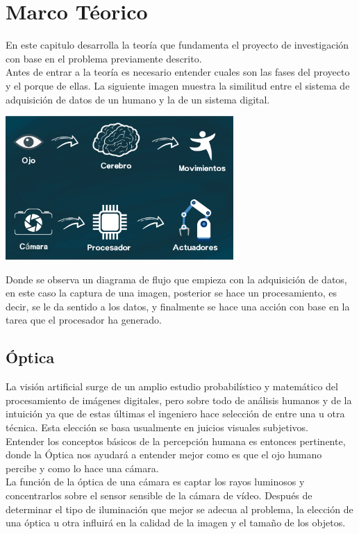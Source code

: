 \chapter{Marco Téorico}
En este capitulo desarrolla la teoría que fundamenta el proyecto de investigación con base
en el problema previamente descrito.\\
Antes de entrar a la teoría es necesario entender cuales son las fases del proyecto y
el porque de ellas.
La siguiente imagen muestra la similitud entre el sistema de adquisición de datos
de un humano y la de un sistema digital.
\begin{center}
    \includegraphics[width=0.65\textwidth]{Capitulo2/Fig1.eps}       
    \label{Fig1}
\end{center}
Donde se observa un diagrama de flujo que empieza con la adquisición de datos, en este
caso la captura de una imagen, posterior se hace un procesamiento, es decir, se le da
sentido a los datos, y finalmente se hace una acción con base en la tarea que el procesador
ha generado.

\section{Óptica}
La visión artificial surge de un amplio estudio probabilístico y matemático del 
procesamiento de imágenes digitales, pero sobre todo de análisis humanos y de la 
intuición ya que de estas últimas el ingeniero hace selección de entre una u otra 
técnica. Esta elección se basa usualmente en juicios visuales subjetivos.\\
Entender los conceptos básicos de la percepción humana es entonces pertinente, donde 
la Óptica nos ayudará a entender mejor como es que el ojo humano percibe y como lo 
hace una cámara. \\
La función de la óptica de una cámara es captar los rayos luminosos y concentrarlos 
sobre el sensor sensible de la cámara de vídeo. Después de determinar el tipo de 
iluminación que mejor se adecua al problema, la elección de una óptica u otra influirá 
en la calidad de la imagen y el tamaño de los objetos.
